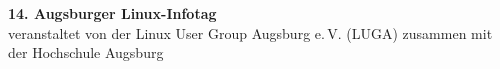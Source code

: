 \documentclass[10pt,a4paper,ngerman]{scrartcl}
\begin{document}
\setlength{\columnsep}{10.5mm}

\begin{landscape}
\sffamily

\begin{center}
     {\huge \textbf{14. Augsburger Linux-Infotag}}\\[2ex]
     veranstaltet von der Linux User Group Augsburg e.\,V. (LUGA) zusammen
     mit der Hochschule Augsburg
\end{center}

\vspace{2ex}



\end{landscape}
\end{document}
